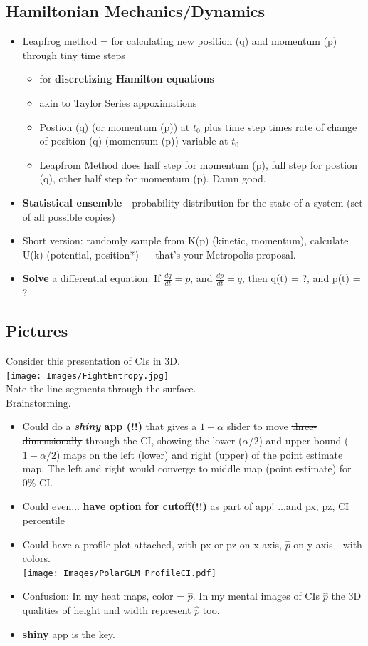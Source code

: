 \documentclass{article}
\begin{document}
\subsection*{Hamiltonian Mechanics/Dynamics }
\begin{itemize}
\item Leapfrog method = for calculating new position (q) and momentum (p) through tiny time steps
  \begin{itemize}
  \item for {\bf discretizing Hamilton equations}
  \item akin to Taylor Series appoximations
  \item Postion (q) (or momentum (p)) at $t_{0}$ plus time step times rate of change of position (q) (momentum (p)) variable at $t_{0}$
  \item Leapfrom Method does half step for momentum (p), full step for postion (q), other half step for momentum (p). Damn good.

  \end{itemize}
\item {\bf Statistical ensemble} - probability distribution for the state of a system (set of all possible copies)
\item Short version: randomly sample from K(p) (kinetic, momentum), calculate U(k) (potential, position*) --- that's your Metropolis proposal.
\item {\bf Solve} a differential equation: If $\frac{dq}{dt} = p$, and $\frac{dp}{dt} = q$, then q(t) = ?, and p(t) = ?
\end{itemize}

\subsection*{Pictures}
Consider this presentation of CIs in 3D. \\
\texttt{[image: Images/FightEntropy.jpg]} \\
Note the line segments through the surface. \\
Brainstorming.
\begin{itemize}
\item Could do a {\bf {\it shiny} app (!!)} that gives a $1-\alpha$ slider to move \sout{three-dimensionally} through the CI, showing the lower ($\alpha/2$) and upper bound ($1-\alpha/2$) maps on the left (lower) and right (upper) of the point estimate map. The left and right would converge to middle map (point estimate) for 0\% CI. 
\item Could even... {\bf have option for cutoff(!!)} as part of app! ...and px, pz, CI percentile
\item Could have a profile plot attached, with px or pz on x-axis, $\hat{p}$ on y-axis---with colors. \\
    \texttt{[image: Images/PolarGLM\_ProfileCI.pdf]} 
\item Confusion: In my heat maps, color = $\hat{p}$. In my mental images of  CIs $\hat{p}$ the 3D qualities of height and width represent $\hat{p}$ too. 
\item {\bf shiny} app is the key.
\end{itemize}
\end{document}
